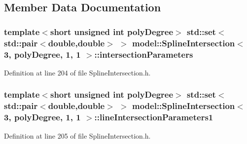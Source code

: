\subsection{Member Data Documentation}
\hypertarget{classmodel_1_1_spline_intersection_3_013_00_01poly_degree_00_011_00_011_01_4_a7ee855d10ea13b6cad3b0b843a98fac3}{}
\subsubsection[{intersection\+Parameters}]{\setlength{\rightskip}{0pt plus 5cm}template$<$short unsigned int poly\+Degree$>$ {\bf std\+::set}$<$std\+::pair$<$double,double$>$ $>$ {\bf model\+::\+Spline\+Intersection}$<$ 3, poly\+Degree, 1, 1 $>$\+::intersection\+Parameters}\label{classmodel_1_1_spline_intersection_3_013_00_01poly_degree_00_011_00_011_01_4_a7ee855d10ea13b6cad3b0b843a98fac3}


Definition at line 204 of file Spline\+Intersection.\+h.

\hypertarget{classmodel_1_1_spline_intersection_3_013_00_01poly_degree_00_011_00_011_01_4_a890cf5ca64741e442cc4edc7d6d2d9bd}{}
\subsubsection[{line\+Intersection\+Parameters1}]{\setlength{\rightskip}{0pt plus 5cm}template$<$short unsigned int poly\+Degree$>$ {\bf std\+::set}$<$std\+::pair$<$double,double$>$ $>$ {\bf model\+::\+Spline\+Intersection}$<$ 3, poly\+Degree, 1, 1 $>$\+::line\+Intersection\+Parameters1}\label{classmodel_1_1_spline_intersection_3_013_00_01poly_degree_00_011_00_011_01_4_a890cf5ca64741e442cc4edc7d6d2d9bd}


Definition at line 205 of file Spline\+Intersection.\+h.

